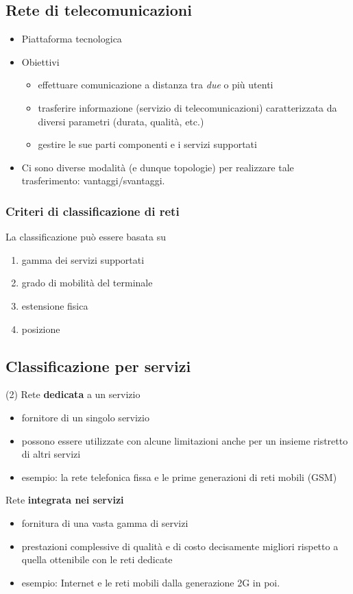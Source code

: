 \documentclass{book}
\begin{document}
\subsection{Rete di telecomunicazioni}
\begin{itemize}
	\item Piattaforma tecnologica
	\item Obiettivi
		\begin{itemize}
			\item effettuare comunicazione a distanza tra \textit{due} o più
				utenti
			\item trasferire informazione (servizio di telecomunicazioni)
				caratterizzata da diversi parametri (durata, qualità, etc.)
			\item gestire le sue parti componenti e i servizi supportati
		\end{itemize}
	\item Ci sono diverse modalità (e dunque topologie) per realizzare tale
		trasferimento: vantaggi/svantaggi.
\end{itemize}
\subsubsection{Criteri di classificazione di reti}
La classificazione può essere basata su
\begin{enumerate}
	\item gamma dei servizi supportati
	\item grado di mobilità del terminale
	\item estensione fisica
	\item posizione
\end{enumerate}
\subsection{Classificazione per servizi}
\begin{tasks}(2)
	\task Rete \textbf{dedicata} a un servizio
	\begin{itemize}
		\item fornitore di un singolo servizio
		\item possono essere utilizzate con alcune limitazioni anche per un
			insieme ristretto di altri servizi
		\item esempio: la rete telefonica fissa e le prime generazioni di reti
			mobili (GSM)
	\end{itemize}
	\task Rete \textbf{integrata nei servizi}
	\begin{itemize}
		\item fornitura di una vasta gamma di servizi
		\item prestazioni complessive di qualità e di costo decisamente
			migliori rispetto a quella ottenibile con le reti dedicate
		\item esempio: Internet e le reti mobili dalla generazione 2G in poi.
	\end{itemize}
\end{tasks}
\end{document}
